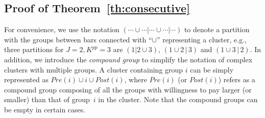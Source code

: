 \documentclass[twocolumn,10pt,twosided]{IEEEtran}
\begin{document}
\subsection{Proof of Theorem~\ref{th:consecutive}}
\label{proof_th:consecutive}
For convenience, we use the notation $(\cdots\cup\cdots|\cdots\cup\cdots|\cdots)$ to denote a partition with the groups between bars connected with ``$\cup$'' representing a cluster, e.g., three partitions for $J=2, K^{pp}=3$ are
$(1|2\cup3)$, $(1\cup 2\,|\,3)$ and $(1\cup3\,|\,2)$. In addition, we introduce the \emph{compound group} to simplify the notation of complex clusters with multiple groups. A cluster containing group $i$ can be simply represented as $Pre(i)\cup i\cup Post(i)$, where $Pre(i)$ (or $Post(i)$) refers as a compound group composing of all the groups with willingness to pay larger (or
smaller) than that of group~$i$ in the cluster. Note that the compound groups can be empty in certain cases.
\end{document}
